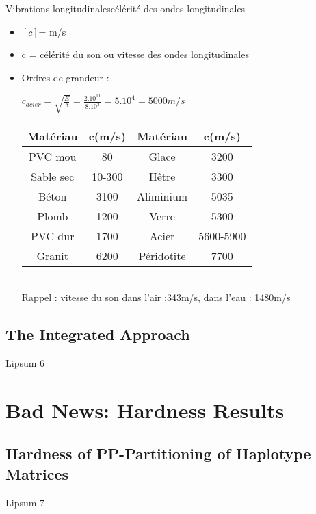 \documentclass[]{beamer}
\begin{document}
	\begin{frame} {Vibrations longitudinales}{célérité des ondes longitudinales}
	\begin{itemize}
	\item {$[c]$= m/s}
	\item c = célérité du son ou vitesse des ondes longitudinales 
	\item Ordres de grandeur : 
\begin{center}

	$ c_{acier} = \sqrt{\frac{E}{\delta} } = \frac{2.10^{11}}{8.10^{3} }= 5.10^4 = 5000m/s  $ 
	\\
	\hspace{1cm}
\end{center}
	\begin{tabular}{|c|c|c|c|}
	\hline 
	Matériau & c(m/s) & Matériau & c(m/s) \\ 
	\hline 
	PVC mou & 80 & Glace & 3200 \\ 
	\hline 
	Sable sec & 10-300 & Hêtre & 3300 \\ 
	\hline 
	Béton & 3100 & Aliminium & 5035 \\ 
	\hline 
	Plomb & 1200 & Verre & 5300 \\ 
	\hline 
	PVC dur & 1700 & Acier & 5600-5900 \\ 
	\hline 
	Granit & 6200 & Péridotite & 7700 \\ 
	\hline 
	\end{tabular} 
	\\
	
	Rappel : vitesse du son dans l'air :343m/s, dans l'eau : 1480m/s
	\end{itemize}
		\end{frame}
	
	\subsection{The Integrated Approach}
	\begin{frame}{Lipsum 6}
	\lipsum[6]
	\end{frame}
\section{Bad News: Hardness Results}
	\subsection{Hardness of PP-Partitioning of 										Haplotype Matrices}
	\begin{frame}{Lipsum 7}
	\lipsum[7]
	\end{frame}
\end{document}
